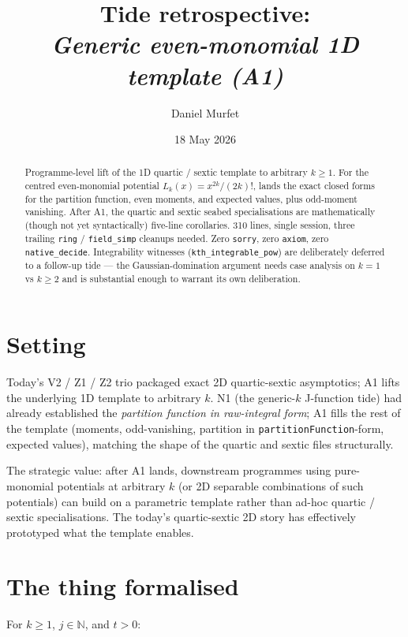 \documentclass[11pt]{article}
\title{Tide retrospective:\\\emph{Generic even-monomial 1D template (A1)}}
\author{Daniel Murfet}
\date{18 May 2026}
\begin{document}
\maketitle

\begin{abstract}
Programme-level lift of the 1D quartic / sextic template to arbitrary
$k \ge 1$. For the centred even-monomial potential
$L_k(x) = x^{2k}/(2k)!$, lands the exact closed forms for the
partition function, even moments, and expected values, plus
odd-moment vanishing. After A1, the quartic and sextic seabed
specialisations are mathematically (though not yet syntactically)
five-line corollaries. 310 lines, single session, three trailing
\texttt{ring} / \texttt{field\_simp} cleanups needed. Zero
\texttt{sorry}, zero \texttt{axiom}, zero \texttt{native\_decide}.
Integrability witnesses (\texttt{kth\_integrable\_pow}) are
deliberately deferred to a follow-up tide --- the Gaussian-domination
argument needs case analysis on $k = 1$ vs $k \ge 2$ and is
substantial enough to warrant its own deliberation.
\end{abstract}

\section{Setting}

Today's V2 / Z1 / Z2 trio packaged exact 2D quartic-sextic
asymptotics; A1 lifts the underlying 1D template to arbitrary $k$.
N1 (the generic-$k$ J-function tide) had already established the
\emph{partition function in raw-integral form}; A1 fills the rest of
the template (moments, odd-vanishing, partition in
\texttt{partitionFunction}-form, expected values), matching the shape
of the quartic and sextic files structurally.

The strategic value: after A1 lands, downstream programmes using
pure-monomial potentials at arbitrary $k$ (or 2D separable
combinations of such potentials) can build on a parametric template
rather than ad-hoc quartic / sextic specialisations. The today's
quartic-sextic 2D story has effectively prototyped what the template
enables.

\section{The thing formalised}

For $k \ge 1$, $j \in \mathbb N$, and $t > 0$:
\end{document}
